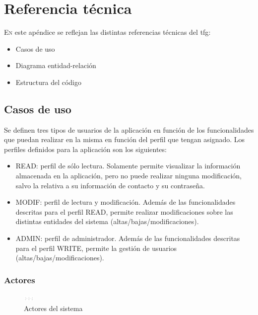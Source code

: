 \chapter{Referencia técnica}
\label{chap:ref-tecnica}

\lettrine{E}{n} este apéndice se reflejan las distintas referencias técnicas del \acrshort{tfg}:

\begin{itemize}
\item Casos de uso
\item Diagrama entidad-relación
\item Estructura del código
\end{itemize}

\section{Casos de uso}
\label{chap:casos-uso}

Se definen tres tipos de usuarios de la aplicación en función de los funcionalidades que puedan realizar en la misma en función del perfil que tengan asignado. Los perfiles definidos para la aplicación son los siguientes:

\begin{itemize}
\item READ: perfil de sólo lectura. Solamente permite visualizar la información almacenada en la aplicación, pero no puede realizar ninguna modificación, salvo la relativa a su información de contacto y su contraseña.
\item MODIF: perfil de lectura y modificación. Además de las funcionalidades descritas para el perfil READ, permite realizar modificaciones sobre las distintas entidades del sistema (altas/bajas/modificaciones).
\item ADMIN: perfil de administrador. Además de las funcionalidades descritas para el perfil WRITE, permite la gestión de usuarios (altas/bajas/modificaciones).
\end{itemize}


\subsection{Actores}
\label{sub:actores}


\begin{figure}[hp!]
  \centering
  \includegraphics[width=0.05\textwidth]{imaxes/actores.png}
  \caption{Actores del sistema}
  \label{fig:actores}
\end{figure}

